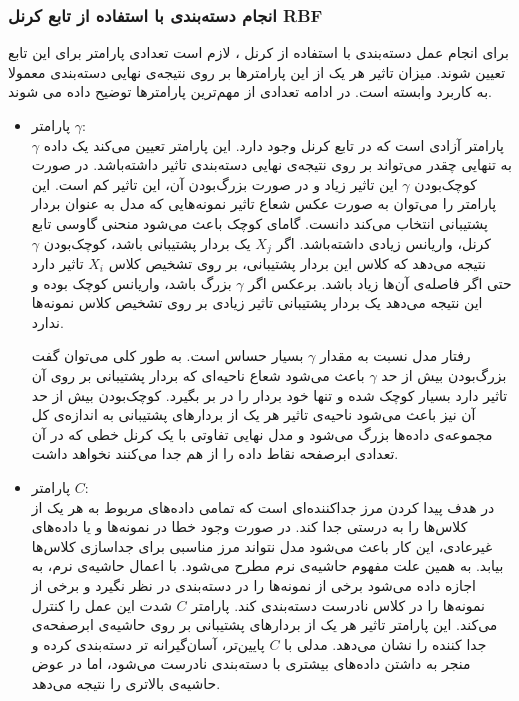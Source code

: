 \subsubsection{ انجام دسته‌بندی  با استفاده از تابع کرنل RBF}
برای انجام عمل دسته‌بندی با استفاده از کرنل ، لازم است تعدادی پارامتر برای این تابع تعیین شوند. میزان تاثیر هر یک از این پارامترها بر روی نتیجه‌ی نهایی دسته‌بندی معمولا به کاربرد وابسته است. در ادامه تعدادی از  مهم‌ترین پارامترها توضیح داده می شوند. 
\begin{itemize}
	\item پارامتر $\gamma$:
	\\
	$\gamma$ پارامتر آزادی است که در تابع کرنل  وجود دارد. این پارامتر تعیین می‌کند یک داده به تنهایی چقدر می‌تواند بر روی نتیجه‌ی نهایی دسته‌بندی تاثیر داشته‌باشد. در صورت کوچک‌بودن $\gamma$ این تاثیر زیاد و در صورت بزرگ‌بودن آن، این تاثیر کم است. این پارامتر را می‌توان به صورت عکس شعاع تاثیر نمونه‌هایی که مدل به عنوان بردار پشتیبانی انتخاب می‌کند دانست. گامای کوچک باعث می‌شود منحنی گاوسی تابع کرنل، واریانس زیادی داشته‌باشد. اگر $X_j$ یک بردار پشتیبانی باشد، کوچک‌بودن $\gamma$ نتیجه می‌دهد که کلاس این بردار پشتیبانی، بر روی تشخیص کلاس $X_i$  تاثیر دارد حتی اگر فاصله‌ی آن‌ها زیاد باشد. برعکس اگر $\gamma$ بزرگ باشد، واریانس کوچک بوده و این نتیجه می‌دهد یک بردار پشتیبانی تاثیر زیادی بر روی تشخیص کلاس نمونه‌ها ندارد.

رفتار مدل نسبت به مقدار $\gamma$ بسیار حساس است. به طور کلی می‌توان گفت بزرگ‌بودن بیش از حد $\gamma$ باعث می‌شود شعاع ناحیه‌ای که بردار پشتیبانی بر روی آن تاثیر دارد بسیار کوچک شده و تنها خود بردار را در بر بگیرد. کوچک‌بودن بیش از حد آن نیز باعث می‌شود ناحیه‌ی تاثیر هر یک از بردارهای پشتیبانی به اندازه‌ی کل مجموعه‌ی داده‌ها بزرگ می‌شود و مدل نهایی تفاوتی با یک کرنل خطی که در آن تعدادی ابرصفحه نقاط داده را از هم جدا می‌کنند نخواهد داشت.

	\item پارامتر $C$:
	\\
	در  هدف پیدا کردن مرز جداکننده‌ای است که تمامی داده‌های مربوط به هر یک از کلاس‌ها را به درستی جدا کند. در صورت وجود خطا در نمونه‌ها و یا داده‌های غیرعادی، این کار باعث می‌شود مدل نتواند مرز مناسبی برای جداسازی کلاس‌ها بیابد. به همین علت مفهوم حاشیه‌ی نرم مطرح می‌شود. با اعمال حاشیه‌ی نرم، به  اجازه داده می‌شود برخی از نمونه‌ها را در دسته‌بندی در نظر نگیرد و برخی از نمونه‌ها را در کلاس نادرست دسته‌بندی کند. پارامتر $C$ شدت این عمل را کنترل می‌کند. این پارامتر تاثیر هر یک از بردارهای پشتیبانی بر روی حاشیه‌ی ابرصفحه‌ی جدا کننده را نشان می‌دهد. مدلی با $C$ پایین‌تر، آسان‌گیرانه تر دسته‌بندی کرده و منجر به داشتن داده‌های بیشتری با دسته‌بندی نادرست می‌شود، اما در عوض حاشیه‌ی بالاتری را نتیجه می‌دهد. 
\end{itemize} 
 

